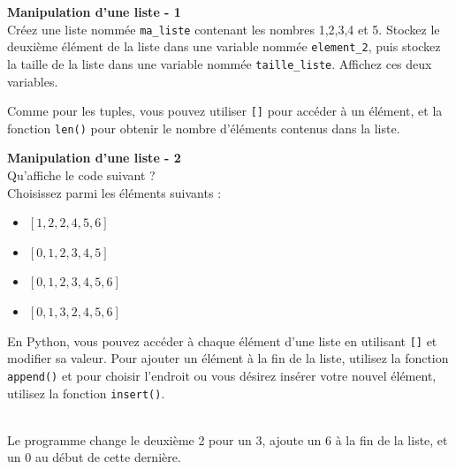      \begin{Exercice}[5 minutes] [Python] \textbf{Manipulation d'une liste - 1}\\
        Créez une liste nommée \lstinline{ma_liste} contenant les nombres 1,2,3,4 et 5. Stockez le deuxième élément de la liste dans une variable nommée \lstinline{element_2}, puis stockez la taille de la liste dans une variable nommée \lstinline{taille_liste}. Affichez ces deux variables.\\
    
        \begin{conseil}
            Comme pour les tuples, vous pouvez utiliser \lstinline{[]} pour accéder à un élément, et la fonction \lstinline{len()} pour obtenir le nombre d'éléments contenus dans la liste.
        \end{conseil}
        
        \begin{solution}
             
        \end{solution}
    \end{Exercice}
    
    \begin{Exercice}[5 minutes] [Python] \textbf{Manipulation d'une liste - 2}\\
       Qu'affiche le code suivant ? \\
       
        
       
       Choisissez parmi les éléments suivants :
       
       	\begin{itemize}
    \item \([1, 2, 2, 4, 5, 6]\)
    \item \([0, 1, 2, 3, 4, 5]\)
    \item \([0, 1, 2, 3, 4, 5, 6]\)
    \item \([0, 1, 3, 2, 4, 5, 6]\)
\end{itemize}
    
        \begin{conseil}
            En Python, vous pouvez accéder à chaque élément d'une liste en utilisant \lstinline{[]} et modifier sa valeur. Pour ajouter un élément à la fin de la liste, utilisez la fonction \lstinline{append()} et pour choisir l'endroit ou vous désirez insérer votre nouvel élément, utilisez la fonction \lstinline{insert()}.
        \end{conseil}
        
        \begin{solution}
            [0, 1, 2, 3, 4, 5, 6] \\
            Le programme change le deuxième 2 pour un 3, ajoute un 6 à la fin de la liste, et un 0 au début de cette dernière.
        \end{solution}
    \end{Exercice}


